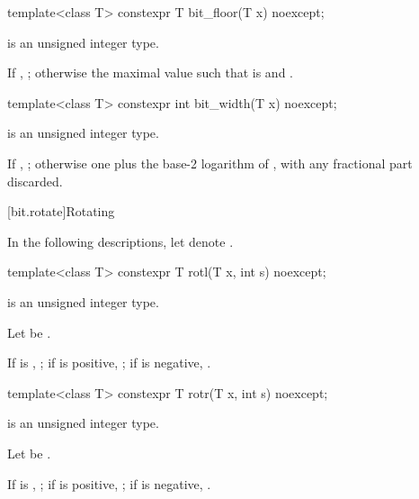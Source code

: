 %
\begin{itemdecl}
template<class T>
  constexpr T bit_floor(T x) noexcept;
\end{itemdecl}

\begin{itemdescr}
\pnum
\constraints
{} is an unsigned integer type.

\pnum
\returns
If , ;
otherwise the maximal value 
such that  is  and .

\end{itemdescr}

%
\begin{itemdecl}
template<class T>
  constexpr int bit_width(T x) noexcept;
\end{itemdecl}

\begin{itemdescr}
\pnum
\constraints
{} is an unsigned integer type.

\pnum
\returns
If , ;
otherwise one plus the base-2 logarithm of ,
with any fractional part discarded.

\end{itemdescr}

[bit.rotate]{Rotating}

\pnum
In the following descriptions,
let  denote .

\begin{itemdecl}
template<class T>
  constexpr T rotl(T x, int s) noexcept;
\end{itemdecl}

%
\begin{itemdescr}
\pnum
\constraints
{} is an unsigned integer type.

\pnum
Let  be .

\pnum
\returns
If  is , ;
if  is positive, ;
if  is negative, .
\end{itemdescr}

\begin{itemdecl}
template<class T>
  constexpr T rotr(T x, int s) noexcept;
\end{itemdecl}

%
\begin{itemdescr}
\pnum
\constraints
{} is an unsigned integer type.

\pnum
Let  be .

\pnum
\returns
If  is , ;
if  is positive, ;
if  is negative, .
\end{itemdescr}

